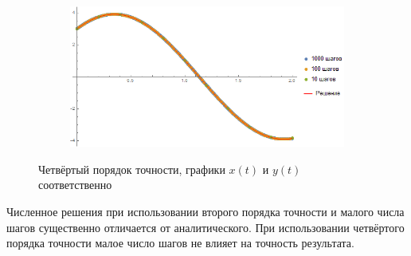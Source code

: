 \documentclass[a4paper,12pt,titlepage,finall]{article}
\begin{document}
\begin{enumerate}
\begin{figure}[h]
\begin{subfigure}{.5\textwidth}
\end{subfigure}%
\begin{subfigure}{.5\textwidth}
  \centering
  \includegraphics[width=\textwidth]{test_1_5_4_y.png}
\end{subfigure}
\caption{Четвёртый порядок точности, графики $x(t)$ и $y(t)$ соответственно}
\end{figure}
\par
Численное решения при использовании второго порядка точности и малого числа шагов существенно отличается от аналитического. При использовании четвёртого порядка точности малое число шагов не влияет на точность результата.


\end{enumerate}
\end{document}
